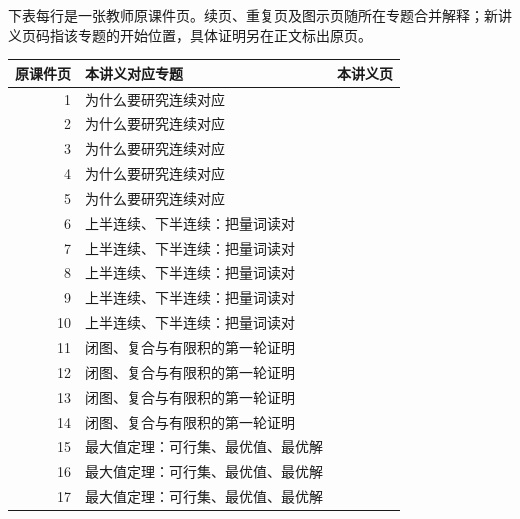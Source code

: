 下表每行是一张教师原课件页。续页、重复页及图示页随所在专题合并解释；新讲义页码指该专题的开始位置，具体证明另在正文标出原页。

\begin{longtable}{r p{.66\linewidth} r}\toprule 原课件页&本讲义对应专题&本讲义页\\\midrule\endhead

1 & 为什么要研究连续对应 & \pageref{g:108:1}\\

2 & 为什么要研究连续对应 & \pageref{g:108:1}\\

3 & 为什么要研究连续对应 & \pageref{g:108:1}\\

4 & 为什么要研究连续对应 & \pageref{g:108:1}\\

5 & 为什么要研究连续对应 & \pageref{g:108:1}\\

6 & 上半连续、下半连续：把量词读对 & \pageref{g:108:6}\\

7 & 上半连续、下半连续：把量词读对 & \pageref{g:108:6}\\

8 & 上半连续、下半连续：把量词读对 & \pageref{g:108:6}\\

9 & 上半连续、下半连续：把量词读对 & \pageref{g:108:6}\\

10 & 上半连续、下半连续：把量词读对 & \pageref{g:108:6}\\

11 & 闭图、复合与有限积的第一轮证明 & \pageref{g:108:11}\\

12 & 闭图、复合与有限积的第一轮证明 & \pageref{g:108:11}\\

13 & 闭图、复合与有限积的第一轮证明 & \pageref{g:108:11}\\

14 & 闭图、复合与有限积的第一轮证明 & \pageref{g:108:11}\\

15 & 最大值定理：可行集、最优值、最优解 & \pageref{g:108:15}\\

16 & 最大值定理：可行集、最优值、最优解 & \pageref{g:108:15}\\

17 & 最大值定理：可行集、最优值、最优解 & \pageref{g:108:15}\\


\end{longtable}

